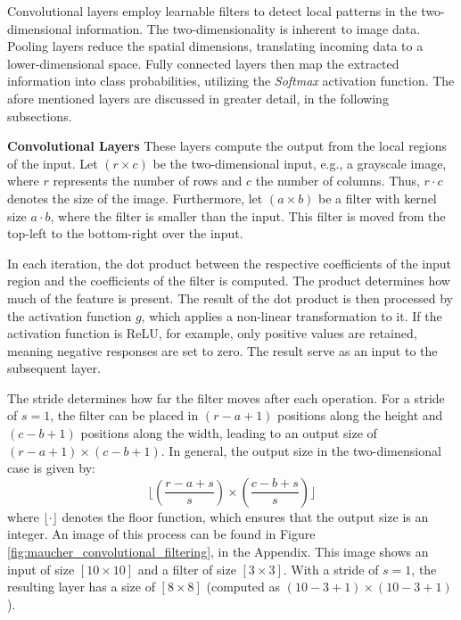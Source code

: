Convolutional layers employ learnable filters to detect local patterns in the two-dimensional information. The two-dimensionality is inherent to image data. Pooling layers reduce the spatial dimensions, translating incoming data to a lower-dimensional space. Fully connected layers then map the extracted information into class probabilities, utilizing the \textit{Softmax} activation function. The afore mentioned layers are discussed in greater detail, in the following subsections.

\vspace{1em}

\textbf{Convolutional Layers}\label{theoretical_classification_conv_layers}
These layers compute the output from the local regions of the input. Let $(r \times c)$ be the two-dimensional input, e.g., a grayscale image, where $r$ represents the number of rows and $c$ the number of columns. Thus, $r \cdot c$ denotes the size of the image. Furthermore, let $(a \times b)$ be a filter with kernel size $a \cdot b$, where the filter is smaller than the input. This filter is moved from the top-left to the bottom-right over the input.

In each iteration, the dot product between the respective coefficients of the input region and the coefficients of the filter is computed. The product determines how much of the feature is present. The result of the dot product is then processed by the activation function $g$, which applies a non-linear transformation to it. If the activation function is ReLU, for example, only positive values are retained, meaning negative responses are set to zero. The result serve as an input to the subsequent layer.

The stride determines how far the filter moves after each operation. For a stride of $s = 1$, the filter can be placed in $(r - a + 1)$ positions along the height and $(c - b + 1)$ positions along the width, leading to an output size of $(r - a + 1) \times (c - b + 1)$. In general, the output size in the two-dimensional case is given by:
\[
\lfloor\left( \frac{r - a + s}{s} \right) \times \left( \frac{c - b + s}{s} \right)\rfloor
\]
where $\lfloor \cdot \rfloor$ denotes the floor function, which ensures that the output size is an integer. An image of this process can be found in Figure \ref{fig:maucher_convolutional_filtering}, in the Appendix. This image shows an input of size $[10 \times 10]$ and a filter of size $[3 \times 3]$. With a stride of $s = 1$, the resulting layer has a size of $[8 \times 8]$ (computed as $\left(10 - 3 + 1\right) \times \left(10 - 3 + 1\right)$).

